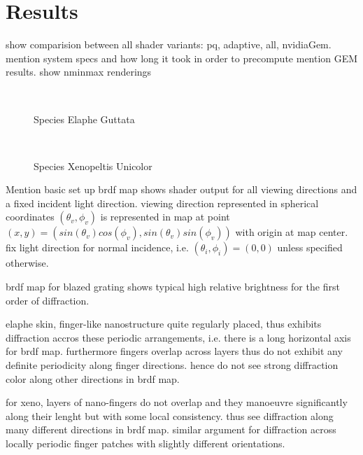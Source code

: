 \chapter{Results}

show comparision between all shader variants: pq, adaptive, all, nvidiaGem.
mention system specs and how long it took in order to precompute
mention GEM results.
show nminmax renderings

\begin{figure}[H]
  \centering
~
  \label{realImageElapheGuttata}
  \caption{Species Elaphe Guttata}
\end{figure}

\begin{figure}[H]
  \centering
~
  \label{realImageXenopeltis}
  \caption{Species Xenopeltis Unicolor}
\end{figure}

Mention basic set up
brdf map shows shader output for all viewing directions and a fixed incident light direction. viewing direction represented in spherical coordinates $(\theta_v, \phi_v)$ is represented in map at point $(x,y) = (sin(\theta_v)cos(\phi_v), sin(\theta_v)sin(\phi_v))$ with origin at map center. fix light direction for normal incidence, i.e. $(\theta_i, \phi_i) = (0,0)$ unless specified otherwise.

brdf map for blazed grating shows typical high relative brightness for the first order of diffraction.

elaphe skin, finger-like nanostructure quite regularly placed, thus exhibits diffraction accros these periodic arrangements, i.e. there is a long horizontal axis for brdf map. furthermore fingers overlap across layers thus do not exhibit any definite periodicity along finger directions. hence do not see strong diffraction color along other directions in brdf map.

for xeno, layers of nano-fingers do not overlap and they manoeuvre significantly along their lenght but with some local consistency. thus see diffraction along many different directions in brdf map. similar argument for diffraction across locally periodic finger patches with slightly different orientations.

